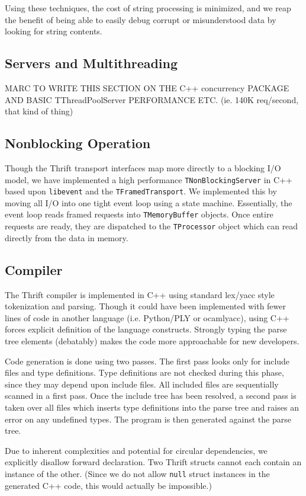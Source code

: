 \documentclass[nocopyrightspace,blockstyle]{sigplanconf}
\begin{document}
Using these techniques, the cost of string processing is minimized, and we
reap the benefit of being able to easily debug corrupt or misunderstood data by
looking for string contents.

\subsection{Servers and Multithreading}
MARC TO WRITE THIS SECTION ON THE C++ concurrency PACKAGE AND
BASIC TThreadPoolServer PERFORMANCE ETC. (ie. 140K req/second, that kind of
thing)

\subsection{Nonblocking Operation}
Though the Thrift transport interfaces map more directly to a blocking I/O
model, we have implemented a high performance \texttt{TNonBlockingServer}
in C++ based upon \texttt{libevent} and the \texttt{TFramedTransport}. We
implemented this by moving all I/O into one tight event loop using a
state machine. Essentially, the event loop reads framed requests into
\texttt{TMemoryBuffer} objects. Once entire requests are ready, they are
dispatched to the \texttt{TProcessor} object which can read directly from
the data in memory.

\subsection{Compiler}
The Thrift compiler is implemented in C++ using standard lex/yacc style
tokenization and parsing. Though it could have been implemented with fewer
lines of code in another language (i.e. Python/PLY or ocamlyacc), using C++
forces explicit definition of the language constructs. Strongly typing the
parse tree elements (debatably) makes the code more approachable for new
developers.

Code generation is done using two passes. The first pass looks only for
include files and type definitions. Type definitions are not checked during
this phase, since they may depend upon include files. All included files
are sequentially scanned in a first pass. Once the include tree has been
resolved, a second pass is taken over all files which inserts type definitions
into the parse tree and raises an error on any undefined types. The program is
then generated against the parse tree.

Due to inherent complexities and potential for circular dependencies,
we explicitly disallow forward declaration. Two Thrift structs cannot
each contain an instance of the other. (Since we do not allow \texttt{null}
struct instances in the generated C++ code, this would actually be impossible.)
\end{document}
